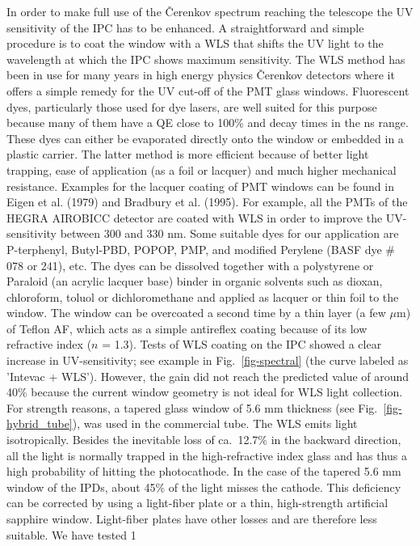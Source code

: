 \medskip In order to make full use of the \v{C}erenkov spectrum reaching the
telescope the UV sensitivity of the IPC has to be enhanced. A
straightforward and simple procedure is to coat the window with a WLS that
shifts the UV light to the wavelength at which the IPC shows maximum
sensitivity. The WLS method has been in use for many years in high energy
physics \v{C}erenkov detectors where it offers a simple remedy for the UV
cut-off of the PMT glass windows. Fluorescent dyes, particularly those used
for dye lasers, are well suited for this purpose because many of them have
a QE close to 100\% and decay times in the ns range. These dyes can either
be evaporated directly onto the window or embedded in a plastic carrier. The
latter method is more efficient because of better light trapping, ease of
application (as a foil or lacquer) and much higher mechanical resistance.
Examples for the lacquer coating of PMT windows can be found in Eigen et al.
(1979) and Bradbury et al. (1995). For example, all the PMTs of the HEGRA
AIROBICC detector are coated with WLS in order to improve the UV-sensitivity
between 300 and 330 nm. Some suitable dyes for our application are
P-terphenyl, Butyl-PBD, POPOP, PMP, and modified Perylene (BASF dye \# 078
or 241), etc. The dyes can be dissolved together with a polystyrene or
Paraloid (an acrylic lacquer base) binder in organic solvents such as
dioxan, chloroform, toluol or dichloromethane and applied as lacquer or thin
foil to the window. The window can be overcoated a second time by a thin
layer (a few $\mu $m) of Teflon AF, which acts as a simple antireflex
coating because of its low refractive index ($n$ = 1.3). Tests of WLS
coating on the IPC showed a clear increase in UV-sensitivity; see example
in Fig.~\ref{fig-spectral}
(the curve labeled as 'Intevac + WLS'). 
However, the gain did not reach the predicted value of
around 40\% because the current window geometry is not ideal for WLS light
collection. For strength reasons, a tapered glass window of 5.6 mm thickness
(see Fig.~\ref{fig-hybrid_tube}), was used in the commercial tube. The WLS emits light
isotropically. Besides the inevitable loss of ca.\ 12.7\% in the backward
direction, all the light is normally trapped in the high-refractive index
glass and has thus a high probability of hitting the photocathode. In the
case of the tapered 5.6 mm window of the IPDs, about 45\% of the light
misses the cathode. This deficiency can be corrected by using a light-fiber
plate or a thin, high-strength artificial sapphire window. Light-fiber
plates have other losses and are therefore less suitable. We have tested 1
